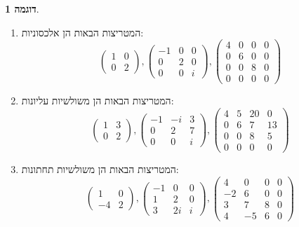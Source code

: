 \documentclass[12pt]{report}
\theoremstyle{plain}
\theoremstyle{definition}
\newtheorem{example}{דוגמה}[chapter]
\newcommand{\0}{\mathbf{0}}
\begin{document}
\begin{example}\
\begin{enumerate}[label=\alph*.]
\item 
המטריצות הבאות הן אלכסוניות:
$$
\begin{pmatrix}
1 &0 \\
0 &2
\end{pmatrix}, \begin{pmatrix}
-1 &0 &0 \\
0 &2 &0 \\
0 &0 &i
\end{pmatrix}, \begin{pmatrix}
4 &0 &0 &0 \\
0 &6 &0 &0 \\
0 &0 &8 &0 \\
0 &0 &0 &0
\end{pmatrix}
$$


\item
המטריצות הבאות הן משולשיות עליונות:
$$
\begin{pmatrix}
1 &3 \\
0 &2
\end{pmatrix}, \begin{pmatrix}
-1 &-i &3 \\
0 &2 &7 \\
0 &0 &i
\end{pmatrix}, \begin{pmatrix}
4 &5 &20 &0 \\
0 &6 &7 &13 \\
0 &0 &8 &5 \\
0 &0 &0 &0
\end{pmatrix}
$$


\item
המטריצות הבאות הן משולשיות תחתונות:
$$
\begin{pmatrix}
1 &0 \\
-4 &2
\end{pmatrix}, \begin{pmatrix}
-1 &0 &0 \\
1 &2 &0 \\
3 &2i &i
\end{pmatrix}, \begin{pmatrix}
4 &0 &0 &0 \\
-2 &6 &0 &0 \\
3 &7 &8 &0 \\
4 &-5 &6 &0
\end{pmatrix}
$$


\end{enumerate}
\end{example} 
\end{document}
